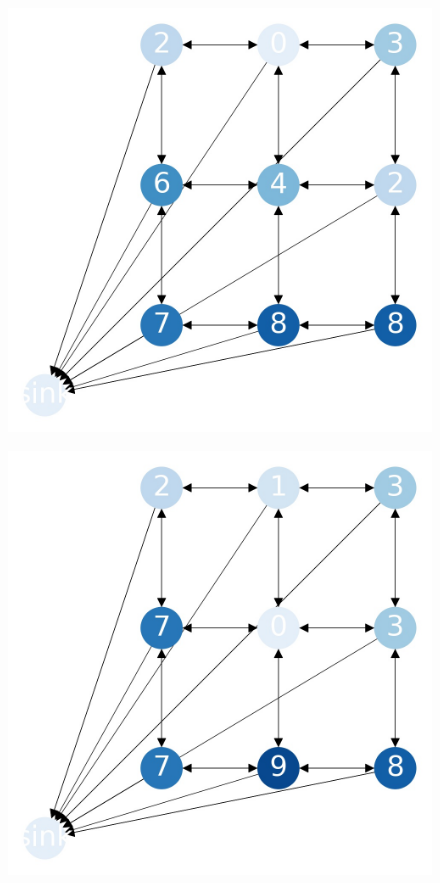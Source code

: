\documentclass{beamer}
\begin{document}
    \begin{frame}
      \begin{figure}[h!]
        \centering
          \includegraphics[scale=0.25]{sandpile_-12}
      \end{figure}
    \end{frame}
    

    \begin{frame}
      \begin{figure}[h!]
        \centering
          \includegraphics[scale=0.25]{sandpile_-13}
      \end{figure}
    \end{frame}
    
\end{document}
